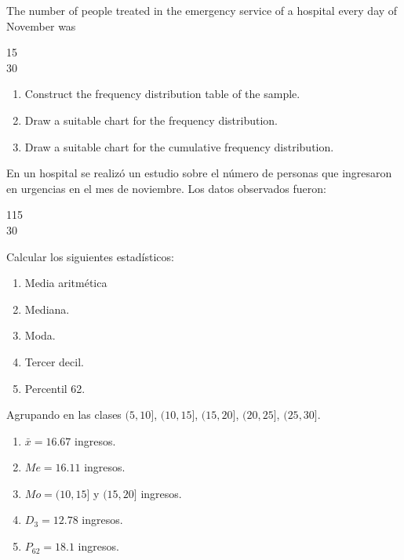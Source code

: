 {The number of people treated in the emergency service of a hospital every day of November
was
\begin{center}
15               \\
30              
\end{center}

\begin{enumerate}
\item Construct the frequency distribution table of the sample.
\item Draw a suitable chart for the frequency distribution.
\item Draw a suitable chart for the cumulative frequency distribution.
\end{enumerate}
}
{
}
{}


{En un hospital se realizó un estudio sobre el número de personas que ingresaron en urgencias en el mes de noviembre. Los datos observados fueron:
\begin{center}
115               \\
30              
\end{center}
Calcular los siguientes estadísticos:
\begin{enumerate}
\item Media aritmética
\item Mediana.
\item Moda.
\item Tercer decil.
\item Percentil 62.
\end{enumerate}
}
{
Agrupando en las clases $(5,10]$, $(10,15]$, $(15,20]$, $(20,25]$, $(25,30]$.
\begin{enumerate}
\item $\bar{x} = 16.67$ ingresos.
\item $Me=16.11$ ingresos.
\item $Mo=(10,15]$ y $(15,20]$ ingresos.
\item $D_3=12.78$ ingresos.
\item $P_{62}=18.1$ ingresos.
\end{enumerate}
}
{}


